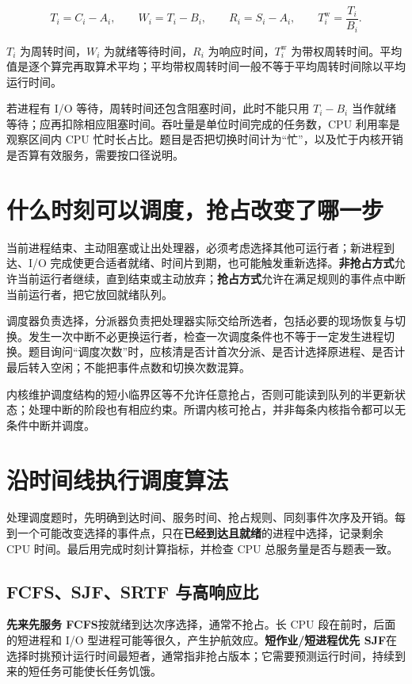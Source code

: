 \[
T_i=C_i-A_i,\qquad W_i=T_i-B_i,\qquad R_i=S_i-A_i,\qquad T_i^{\mathrm{w}}=\frac{T_i}{B_i}.
\]

\(T_i\) 为周转时间，\(W_i\) 为就绪等待时间，\(R_i\) 为响应时间，\(T_i^{\mathrm{w}}\) 为带权周转时间。平均值是逐个算完再取算术平均；平均带权周转时间一般不等于平均周转时间除以平均运行时间。

若进程有 I/O 等待，周转时间还包含阻塞时间，此时不能只用 \(T_i-B_i\) 当作就绪等待；应再扣除相应阻塞时间。吞吐量是单位时间完成的任务数，CPU 利用率是观察区间内 CPU 忙时长占比。题目是否把切换时间计为``忙''，以及忙于内核开销是否算有效服务，需要按口径说明。

\section{什么时刻可以调度，抢占改变了哪一步}\label{os-2-7}

当前进程结束、主动阻塞或让出处理器，必须考虑选择其他可运行者；新进程到达、I/O 完成使更合适者就绪、时间片到期，也可能触发重新选择。\textbf{非抢占方式}允许当前运行者继续，直到结束或主动放弃；\textbf{抢占方式}允许在满足规则的事件点中断当前运行者，把它放回就绪队列。

调度器负责选择，分派器负责把处理器实际交给所选者，包括必要的现场恢复与切换。发生一次中断不必更换运行者，检查一次调度条件也不等于一定发生进程切换。题目询问``调度次数''时，应核清是否计首次分派、是否计选择原进程、是否计最后转入空闲；不能把事件点数和切换次数混算。

内核维护调度结构的短小临界区等不允许任意抢占，否则可能读到队列的半更新状态；处理中断的阶段也有相应约束。所谓内核可抢占，并非每条内核指令都可以无条件中断并调度。

\section{沿时间线执行调度算法}\label{os-2-8}

处理调度题时，先明确到达时间、服务时间、抢占规则、同刻事件次序及开销。每到一个可能改变选择的事件点，只在\textbf{已经到达且就绪}的进程中选择，记录剩余 CPU 时间。最后用完成时刻计算指标，并检查 CPU 总服务量是否与题表一致。

\subsection{FCFS、SJF、SRTF 与高响应比}\label{os-c02-h116}

\textbf{先来先服务 FCFS}按就绪到达次序选择，通常不抢占。长 CPU 段在前时，后面的短进程和 I/O 型进程可能等很久，产生护航效应。\textbf{短作业/短进程优先 SJF}在选择时挑预计运行时间最短者，通常指非抢占版本；它需要预测运行时间，持续到来的短任务可能使长任务饥饿。

